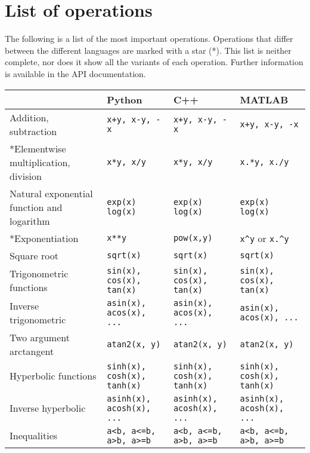 \documentclass[a4paper,12pt]{book}
\begin{document}
\section{List of operations}
The following is a list of the most important operations. Operations that differ between the different
languages are marked with a star (*). This list is neither complete, nor does it show all the variants of
each operation. Further information is available in the API documentation.

\begin{center}
  \scriptsize
  \begin{tabular}{| p{3.5cm} | p{3.5cm} | p{3.5cm} | p{3.5cm} | }
    \hline
      & Python & C++ & MATLAB \\ \hline
    Addition, subtraction
    & \verb|x+y, x-y, -x| & \verb|x+y, x-y, -x| & \verb|x+y, x-y, -x| \\ \hline
    *Elementwise multiplication, division
    & \verb|x*y, x/y| & \verb|x*y, x/y| & \verb|x.*y, x./y| \\ \hline
    Natural exponential function and logarithm
    & \verb|exp(x)| \linebreak \verb|log(x)|
    & \verb|exp(x)| \linebreak \verb|log(x)|
    & \verb|exp(x)| \linebreak \verb|log(x)| \\ \hline
    *Exponentiation & \verb|x**y|
    & \verb|pow(x,y)| & \verb|x^y| or \verb|x.^y| \\ \hline
    Square root & \verb|sqrt(x)|
    & \verb|sqrt(x)| & \verb|sqrt(x)| \\ \hline
    Trigonometric functions & \verb|sin(x), cos(x), tan(x)| & \verb|sin(x), cos(x), tan(x)| & \verb|sin(x), cos(x), tan(x)| \\ \hline
    Inverse trigonometric & \verb|asin(x), acos(x), ...| & \verb|asin(x), acos(x), ...| & \verb|asin(x), acos(x), ...| \\ \hline
    Two argument arctangent & \verb|atan2(x, y)| & \verb|atan2(x, y)| & \verb|atan2(x, y)| \\ \hline
    Hyperbolic functions & \verb|sinh(x), cosh(x), tanh(x)| & \verb|sinh(x), cosh(x), tanh(x)| & \verb|sinh(x), cosh(x), tanh(x)| \\ \hline
    Inverse hyperbolic & \verb|asinh(x), acosh(x), ...| & \verb|asinh(x), acosh(x), ...| & \verb|asinh(x), acosh(x), ...| \\ \hline
    Inequalities & \verb|a<b, a<=b, a>b, a>=b| & \verb|a<b, a<=b, a>b, a>=b| & \verb|a<b, a<=b, a>b, a>=b| \\ \hline

\end{tabular}
\end{center}
\end{document}
